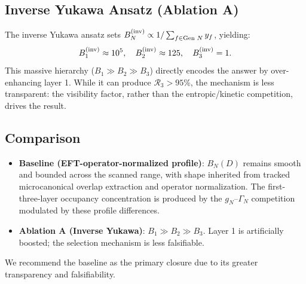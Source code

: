 \documentclass[aps,prd,onecolumn,notitlepage,nofootinbib,superscriptaddress,11pt,floatfix]{revtex4-2}
\begin{document}
\subsection{Inverse Yukawa Ansatz (Ablation A)}
The inverse Yukawa ansatz sets $B_N^{\rm (inv)} \propto 1/\sum_{f \in \text{Gen } N} y_f$, yielding:
\begin{equation}
B_1^{\rm (inv)} \approx 10^5, \quad B_2^{\rm (inv)} \approx 125, \quad B_3^{\rm (inv)} = 1.
\end{equation}
This massive hierarchy ($B_1 \gg B_2 \gg B_3$) directly encodes the answer by over-enhancing layer 1. While it can produce $\mathcal{R}_3 > 95\%$, the mechanism is less transparent: the visibility factor, rather than the entropic/kinetic competition, drives the result.

\subsection{Comparison}
\begin{itemize}
    \item \textbf{Baseline (EFT-operator-normalized profile)}: $B_N(D)$ remains smooth and bounded across the scanned range, with shape inherited from tracked microcanonical overlap extraction and operator normalization. The first-three-layer occupancy concentration is produced by the $g_N$--$\Gamma_N$ competition modulated by these profile differences.
    \item \textbf{Ablation A (Inverse Yukawa)}: $B_1 \gg B_2 \gg B_3$. Layer 1 is artificially boosted; the selection mechanism is less falsifiable.
\end{itemize}

We recommend the baseline as the primary closure due to its greater transparency and falsifiability.

\clearpage


\end{document}
